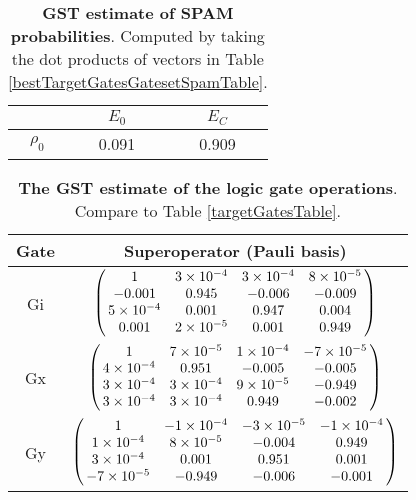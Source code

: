 {\begin{table}[h]
\begin{center}
\begin{tabular}[l]{|c|c|c|}
\hline
 & $E_{0}$ & $E_C$ \\ \hline
$\rho_{0}$ & 0.091 & 0.909 \\ \hline
\end{tabular}

\caption{\textbf{GST estimate of SPAM probabilities}.  Computed by taking the dot products of vectors in Table \ref{bestTargetGatesGatesetSpamTable}.\label{bestTargetGatesGatesetSpamParametersTable}}
\end{center}
\end{table}

\begin{table}[h]
\begin{center}
\begin{tabular}[l]{|c|c|}
\hline
Gate & Superoperator (Pauli basis) \\ \hline
Gi & $ \left(\!\!\begin{array}{cccc}
1 & 3\times 10^{-4} & 3\times 10^{-4} & 8\times 10^{-5} \\ 
-0.001 & 0.945 & -0.006 & -0.009 \\ 
5\times 10^{-4} & 0.001 & 0.947 & 0.004 \\ 
0.001 & 2\times 10^{-5} & 0.001 & 0.949
 \end{array}\!\!\right) $
 \\ \hline
Gx & $ \left(\!\!\begin{array}{cccc}
1 & 7\times 10^{-5} & 1\times 10^{-4} & -7\times 10^{-5} \\ 
4\times 10^{-4} & 0.951 & -0.005 & -0.005 \\ 
3\times 10^{-4} & 3\times 10^{-4} & 9\times 10^{-5} & -0.949 \\ 
3\times 10^{-4} & 3\times 10^{-4} & 0.949 & -0.002
 \end{array}\!\!\right) $
 \\ \hline
Gy & $ \left(\!\!\begin{array}{cccc}
1 & -1\times 10^{-4} & -3\times 10^{-5} & -1\times 10^{-4} \\ 
1\times 10^{-4} & 8\times 10^{-5} & -0.004 & 0.949 \\ 
3\times 10^{-4} & 0.001 & 0.951 & 0.001 \\ 
-7\times 10^{-5} & -0.949 & -0.006 & -0.001
 \end{array}\!\!\right) $
 \\ \hline
\end{tabular}

\caption{\textbf{The GST estimate of the logic gate operations}.  Compare to Table \ref{targetGatesTable}.\label{bestTargetGatesGatesetGatesTable}}
\end{center}
\end{table}

}
